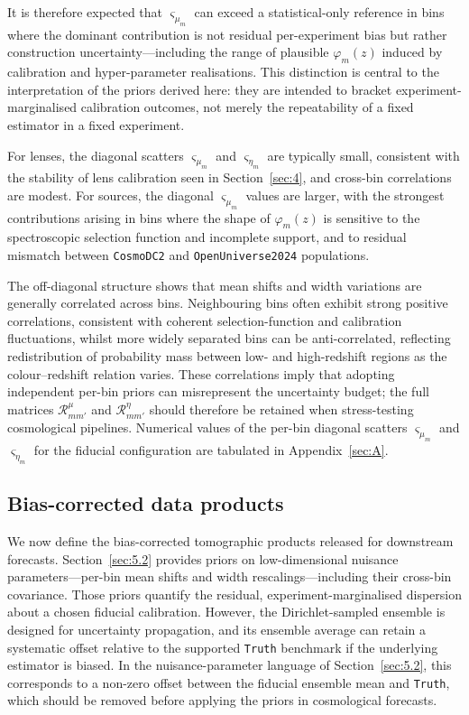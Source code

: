 It is therefore expected that \(\varsigma_{\mu_m}\) can exceed a statistical-only reference in bins where the dominant contribution is not residual per-experiment bias but rather construction uncertainty---including the range of plausible \(\varphi_m(z)\) induced by calibration and hyper-parameter realisations. This distinction is central to the interpretation of the priors derived here: they are intended to bracket experiment-marginalised calibration outcomes, not merely the repeatability of a fixed estimator in a fixed experiment.

For lenses, the diagonal scatters \(\varsigma_{\mu_m}\) and \(\varsigma_{\eta_m}\) are typically small, consistent with the stability of lens calibration seen in Section~\ref{sec:4}, and cross-bin correlations are modest. For sources, the diagonal \(\varsigma_{\mu_m}\) values are larger, with the strongest contributions arising in bins where the shape of \(\varphi_m(z)\) is sensitive to the spectroscopic selection function and incomplete support, and to residual mismatch between \texttt{CosmoDC2} and \texttt{OpenUniverse2024} populations.

The off-diagonal structure shows that mean shifts and width variations are generally correlated across bins. Neighbouring bins often exhibit strong positive correlations, consistent with coherent selection-function and calibration fluctuations, whilst more widely separated bins can be anti-correlated, reflecting redistribution of probability mass between low- and high-redshift regions as the colour--redshift relation varies. These correlations imply that adopting independent per-bin priors can misrepresent the uncertainty budget; the full matrices \(\mathcal{R}^\mu_{m m'}\) and \(\mathcal{R}^\eta_{m m'}\) should therefore be retained when stress-testing cosmological pipelines. Numerical values of the per-bin diagonal scatters \(\varsigma_{\mu_m}\) and \(\varsigma_{\eta_m}\) for the fiducial configuration are tabulated in Appendix~\ref{sec:A}.

\subsection{Bias-corrected data products} \label{sec:5.3}

We now define the bias-corrected tomographic products released for downstream forecasts. Section~\ref{sec:5.2} provides priors on low-dimensional nuisance parameters---per-bin mean shifts and width rescalings---including their cross-bin covariance. Those priors quantify the residual, experiment-marginalised dispersion about a chosen fiducial calibration. However, the Dirichlet-sampled ensemble is designed for uncertainty propagation, and its ensemble average can retain a systematic offset relative to the supported \texttt{Truth} benchmark if the underlying estimator is biased. In the nuisance-parameter language of Section~\ref{sec:5.2}, this corresponds to a non-zero offset between the fiducial ensemble mean and \texttt{Truth}, which should be removed before applying the priors in cosmological forecasts.

